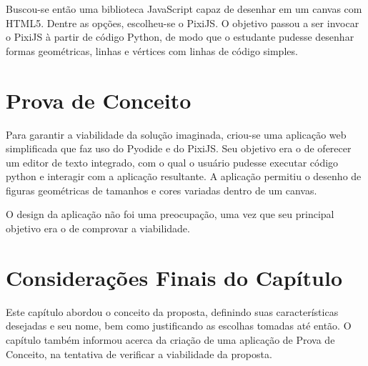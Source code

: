 Buscou-se então uma biblioteca JavaScript capaz de desenhar em um canvas com HTML5. Dentre as opções, escolheu-se o PixiJS. O objetivo passou a ser invocar o PixiJS à partir de código Python, de modo que o estudante pudesse desenhar formas geométricas, linhas e vértices com linhas de código simples.

\section{Prova de Conceito}

Para garantir a viabilidade da solução imaginada, criou-se uma aplicação web simplificada que faz uso do Pyodide e do PixiJS. Seu objetivo era o de oferecer um editor de texto integrado, com o qual o usuário pudesse executar código python e interagir com a aplicação resultante. A aplicação permitiu o desenho de figuras geométricas de tamanhos e cores variadas dentro de um canvas.

O design da aplicação não foi uma preocupação, uma vez que seu principal objetivo era o de comprovar a viabilidade.

\section{Considerações Finais do Capítulo}

Este capítulo abordou o conceito da proposta, definindo suas características desejadas e seu nome,
bem como justificando as escolhas tomadas até então. O capítulo também informou acerca da criação
de uma aplicação de Prova de Conceito, na tentativa de verificar a viabilidade da proposta.
